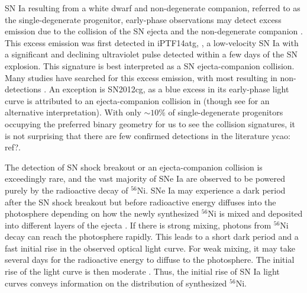 \documentclass[twocolumn]{aastex61}
\newcommand{\ycao}[1]{{\color{red} ycao: {#1}}}
\begin{document}
SN Ia resulting from a white dwarf and non-degenerate companion, referred to as the single-degenerate progenitor, early-phase observations may detect excess emission due to the collision of the SN ejecta and the non-degenerate companion \citep{1973ApJ...186.1007W,2010ApJ...708.1025K}. This excess emission was first detected in iPTF14atg,  \citep{2015Natur.521..328C}, a low-velocity SN Ia with a significant and declining ultraviolet pulse detected within a
few days of the SN explosion. This signature is best interpreted as a
SN ejecta-companion collision. Many studies have searched for this excess emission, with most resulting in non-detections
\citep{2010ApJ...722.1691H,2011ApJ...741...20B,2012ApJ...744...38F,
  2012ApJ...744L..17B,2015Natur.521..332O,
  2013ApJ...778L..15Z,2015ApJ...799..106G,2016ApJ...826..144S,
  2015ApJS..221...22I}. An exception is SN2012cg, 
  as a blue excess in its early-phase light curve is attributed to an ejecta-companion collision in \citet{2016ApJ...820...92M} (though see \citealt{2016arXiv161007601S} for an alternative interpretation). 
With only $\sim 10\%$ of single-degenerate progenitors occupying the preferred binary geometry for us to see the collision
signatures, it is not surprising that there are few confirmed detections in the literature \ycao{ref?}. 

The detection of SN shock breakout or an ejecta-companion collision is exceedingly rare, and the vast majority of SNe Ia are observed to be 
powered purely by the radioactive decay of $^{56}$Ni. 
SNe Ia may experience a dark period after
the SN shock breakout but before radioactive energy diffuses into
the photosphere depending on how the newly synthesized $^{56}$Ni is mixed and deposited into different layers of the ejecta \citep{2014ApJ...784...85P}. If there is strong
mixing, photons from $^{56}$Ni decay can reach the photosphere rapidly. This leads to a short dark period and a fast initial rise in the observed optical light curve. For weak mixing, it may take several days for
the radioactive energy to diffuse to the photosphere. The initial rise
of the light curve is then moderate \citep{2016ApJ...826...96P}. Thus, the initial rise of SN Ia light curves conveys
information on the distribution of synthesized $^{56}$Ni. 
\end{document}

